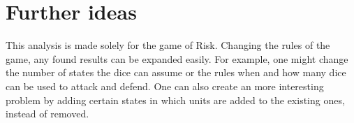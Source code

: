 \documentclass{amsart}
\begin{document}
	\section{Further ideas}
	
	This analysis is made solely for the game of Risk. Changing the rules of the game, any found results can be expanded easily. For example, one might change the number of states the dice can assume or the rules when and how many dice can be used to attack and defend. One can also create an more interesting problem by adding certain states in which units are added to the existing ones, instead of removed.
	
\end{document}

